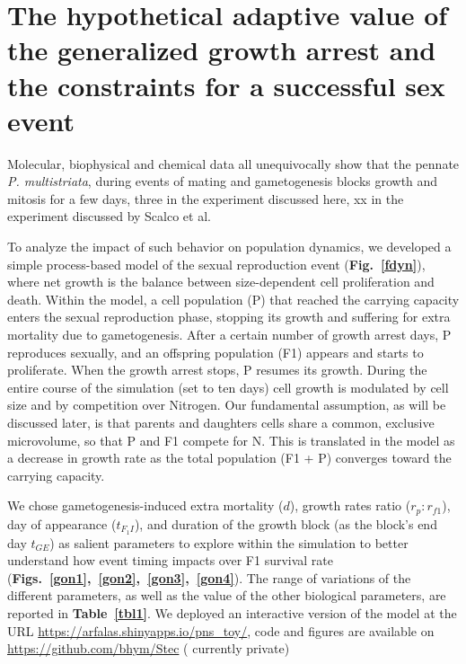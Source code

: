 \documentclass[a4paper,oneside]{book}
\begin{document}
  \section*{The hypothetical adaptive value of the generalized growth arrest and the constraints for a successful sex event}
    Molecular, biophysical and chemical data all unequivocally show that the pennate \textit{P. multistriata}, during events of mating and gametogenesis blocks growth and mitosis for a few days, three in the experiment discussed here, xx in the experiment discussed by Scalco et al.

    To analyze the impact of such behavior on population dynamics, we developed a simple process-based model of the sexual reproduction event (\textbf{Fig.~\ref{fdyn}}), where net growth is the balance between size-dependent cell proliferation and death.
    Within the model, a cell population (P) that reached the carrying capacity enters the sexual reproduction phase, stopping its growth and suffering for extra mortality due to gametogenesis.
    After a certain number of growth arrest days, P reproduces sexually, and an offspring population (F1) appears and starts to proliferate.
    When the growth arrest stops, P resumes its growth.
    During the entire course of the simulation (set to ten days) cell growth is modulated by cell size and by competition over Nitrogen.
    Our fundamental assumption, as will be discussed later, is that parents and daughters cells share a common, exclusive microvolume, so that P and F1 compete for N. This is translated in the model as a decrease in growth rate as the total population (F1 + P) converges toward the carrying capacity.

    We chose gametogenesis-induced extra mortality ($d$), growth rates ratio ($r_p:r_{f1}$), day of appearance ($t_{F_{1}I}$), and duration of the growth block (as the block's end day $t_{GE}$) as salient parameters to explore within the simulation to better understand how event timing impacts over F1 survival rate (\textbf{Figs.~\ref{gon1},~\ref{gon2},~\ref{gon3},~\ref{gon4}}).
    The range of variations of the different parameters, as well as the value of the other biological parameters, are reported in \textbf{Table~\ref{tbl1}}.
    We deployed an interactive version of the model at the URL \url{https://arfalas.shinyapps.io/pns_toy/}, code and figures are available on \url{https://github.com/bhym/Stec} ({\color{red} currently private})
\end{document}
